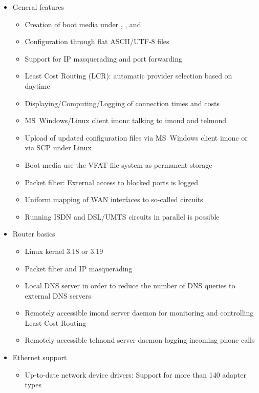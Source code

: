 \begin{itemize}

\item General features

\begin{itemize}
\item Creation of boot media under ,
      , and
\item Configuration through flat ASCII/UTF-8 files
\item Support for IP masquerading and port forwarding
\item Least Cost Routing (LCR): automatic provider selection based on daytime
\item Displaying/Computing/Logging of connection times and costs
\item MS~Windows/Linux client imonc talking to imond and telmond
\item Upload of updated configuration files via MS~Windows client imonc or via
      SCP under Linux
\item Boot media use the VFAT file system as permanent storage
\item Packet filter: External access to blocked ports is logged
\item Uniform mapping of WAN interfaces to so-called circuits
\item Running ISDN and DSL/UMTS circuits in parallel is possible
\end{itemize}

\item Router basics

\begin{itemize}
\item Linux kernel 3.18 or 3.19
\item Packet filter and IP masquerading
\item Local DNS server in order to reduce the number of DNS queries to external
      DNS servers
\item Remotely accessible imond server daemon for monitoring and controlling
      Least Cost Routing
\item Remotely accessible telmond server daemon logging incoming phone calls
\end{itemize}

\item Ethernet support

\begin{itemize}
\item Up-to-date network device drivers: Support for more than 140 adapter types
\end{itemize}


\end{itemize}
